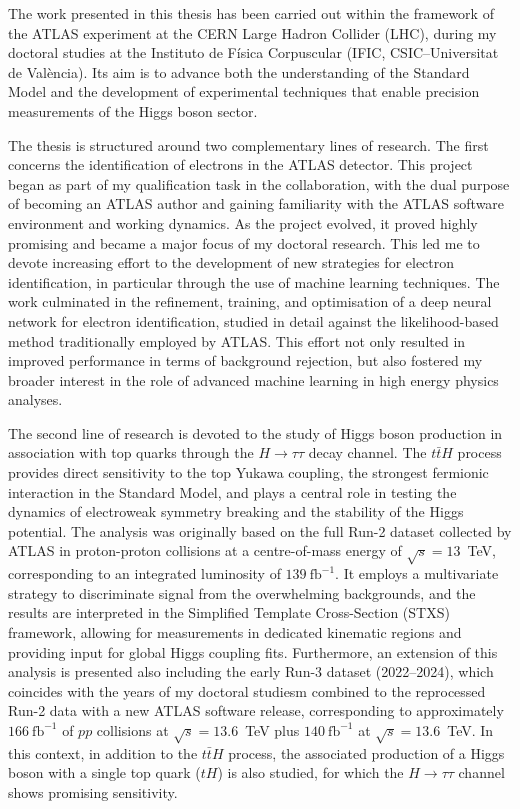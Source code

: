 The work presented in this thesis has been carried out within the framework of the ATLAS experiment at the CERN Large Hadron Collider (LHC), during my doctoral studies at the Instituto de Física Corpuscular (IFIC, CSIC–Universitat de València). Its aim is to advance both the understanding of the Standard Model and the development of experimental techniques that enable precision measurements of the Higgs boson sector.

The thesis is structured around two complementary lines of research. The first concerns the identification of electrons in the ATLAS detector. This project began as part of my qualification task in the collaboration, with the dual purpose of becoming an ATLAS author and gaining familiarity with the ATLAS software environment and working dynamics. As the project evolved, it proved highly promising and became a major focus of my doctoral research. This led me to devote increasing effort to the development of new strategies for electron identification, in particular through the use of machine learning techniques. The work culminated in the refinement, training, and optimisation of a deep neural network for electron identification, studied in detail against the likelihood-based method traditionally employed by ATLAS. This effort not only resulted in improved performance in terms of background rejection, but also fostered my broader interest in the role of advanced machine learning in high energy physics analyses.

The second line of research is devoted to the study of Higgs boson production in association with top quarks through the $H\to\tau\tau$ decay channel. The $t\bar{t}H$ process provides direct sensitivity to the top Yukawa coupling, the strongest fermionic interaction in the Standard Model, and plays a central role in testing the dynamics of electroweak symmetry breaking and the stability of the Higgs potential. The analysis was originally based on the full Run-2 dataset collected by ATLAS in proton-proton collisions at a centre-of-mass energy of $\sqrt{s} = 13$~TeV, corresponding to an integrated luminosity of $139~\mathrm{fb}^{-1}$. It employs a multivariate strategy to discriminate signal from the overwhelming backgrounds, and the results are interpreted in the Simplified Template Cross-Section (STXS) framework, allowing for measurements in dedicated kinematic regions and providing input for global Higgs coupling fits. Furthermore, an extension of this analysis is presented also including the early Run-3 dataset (2022–2024), which coincides with the years of my doctoral studiesm combined to the reprocessed Run-2 data with a new ATLAS software release, corresponding to approximately $166~\mathrm{fb}^{-1}$ of $pp$ collisions at $\sqrt{s} = 13.6$~TeV plus $140~\mathrm{fb}^{-1}$ at $\sqrt{s} = 13.6$~TeV. In this context, in addition to the $t\bar{t}H$ process, the associated production of a Higgs boson with a single top quark ($tH$) is also studied, for which the $H \to \tau\tau$ channel shows promising sensitivity.

